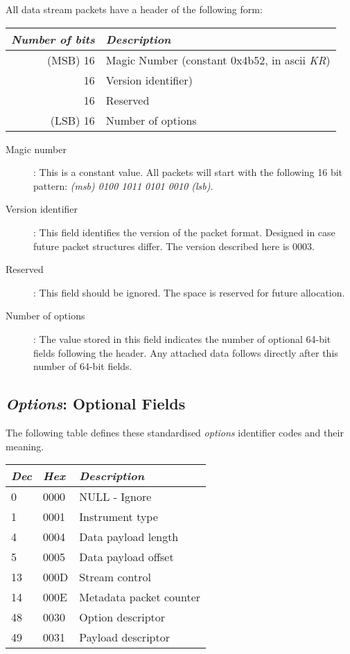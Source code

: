 \documentclass[11pt,english,twoside]{article}
\begin{document}
All data stream packets have a header of the following form:
\begin{table}
\begin{tabular}{|r|l|}
\hline
\emph{Number of bits} & \emph{Description} \\
\hline
(MSB) 16 & Magic Number (constant 0x4b52, in ascii \emph{KR}) \\
      16 & Version identifier) \\
      16 & Reserved \\
(LSB) 16 & Number of options \\
\hline
\end{tabular}
\end{table}

\begin{description}

\item[Magic number]:
This is a constant value. All packets will start with the following 16 bit pattern: \emph{(msb) 0100 1011 0101 0010 (lsb)}.

\item[Version identifier]:
This field identifies the version of the packet format. Designed in case future packet structures differ. The version described here is 0003.

\item[Reserved]:
This field should be ignored. The space is reserved for future allocation.

\item[Number of options]:
The value stored in this field indicates the number of optional 64-bit fields following the header. Any attached data follows directly after this number of 64-bit fields.

\end{description}

\subsection{\emph{Options}: Optional Fields}

The following table defines these standardised \emph{options} identifier codes and their meaning.
\begin{table}
\begin{tabular}{|l|l|l|}
\hline
\emph{Dec} & \emph{Hex} & \emph{Description} \\
\hline
 0 & 0000 & NULL - Ignore \\
 1 & 0001 & Instrument type \\
 4 & 0004 & Data payload length \\
 5 & 0005 & Data payload offset \\
13 & 000D & Stream control \\
14 & 000E & Metadata packet counter \\
48 & 0030 & Option descriptor \\
49 & 0031 & Payload descriptor \\
\hline
\end{tabular}
\end{table}
\end{document}
